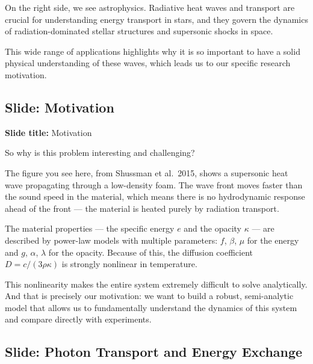 \documentclass[12pt, a4paper]{article}
\begin{document}
On the right side, we see astrophysics. Radiative heat waves and transport are crucial for understanding energy transport in stars, and they govern the dynamics of radiation-dominated stellar structures and supersonic shocks in space.

This wide range of applications highlights why it is so important to have a solid physical understanding of these waves, which leads us to our specific research motivation.

\subsection{Slide: Motivation}

\begin{slidebox}
\textbf{Slide title:} Motivation
\end{slidebox}

So why is this problem interesting and challenging?

The figure you see here, from Shussman et al.\ 2015, shows a supersonic heat wave propagating through a low-density foam. The wave front moves faster than the sound speed in the material, which means there is no hydrodynamic response ahead of the front --- the material is heated purely by radiation transport.

The material properties --- the specific energy $e$ and the opacity $\kappa$ --- are described by power-law models with multiple parameters: $f$, $\beta$, $\mu$ for the energy and $g$, $\alpha$, $\lambda$ for the opacity. Because of this, the diffusion coefficient $D = c/(3\rho\kappa)$ is strongly nonlinear in temperature.

This nonlinearity makes the entire system extremely difficult to solve analytically. And that is precisely our motivation: we want to build a robust, semi-analytic model that allows us to fundamentally understand the dynamics of this system and compare directly with experiments.

\subsection{Slide: Photon Transport and Energy Exchange}
\end{document}
